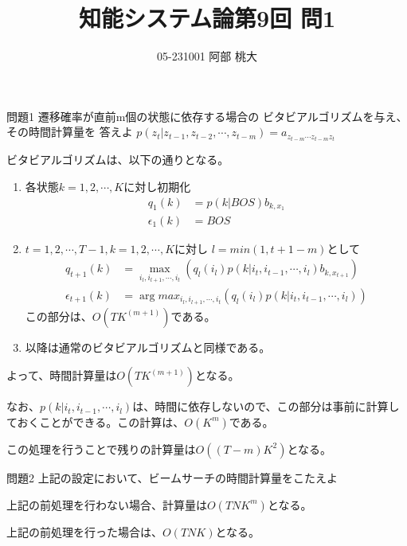 \documentclass[a4paper,11pt]{ltjsarticle}
\begin{document}
\title{知能システム論第9回 問1}
\author{ 05-231001 阿部 桃大}
\maketitle

\begin{itembox}[l]{問題1}
  遷移確率が直前m個の状態に依存する場合の
  ビタビアルゴリズムを与え、その時間計算量を
  答えよ\newline
  $p(z_t|z_{t-1}, z_{t-2}, \cdots, z_{t-m}) = a_{z_{t-m}\cdots z_{t-m}z_t}$
\end{itembox}
ビタビアルゴリズムは、以下の通りとなる。
\begin{enumerate}
  \item 各状態$k=1,2,\cdots,K$に対し初期化
        \begin{align*}
          q_1(k)         & = p(k|BOS)b_{k,x_1} \\
          \epsilon _1(k) & = BOS
        \end{align*}
  \item $t=1,2,\cdots,T-1, k=1,2,\cdots,K$に対し
        $l=min(1,t+1-m)$として
        \begin{align*}
          q_{t+1}(k)         & = \max_{i_l,i_{l+1},\cdots,i_t} (q_l(i_l)p(k|i_t,i_{t-1},\cdots,i_l)b_{k,x_{t+1}}) \\
          \epsilon _{t+1}(k) & = \arg max_{i_l,i_{l+1},\cdots,i_t} (q_l(i_l)p(k|i_t,i_{t-1},\cdots,i_l))
        \end{align*}
        この部分は、$O(TK^{(m+1)})$である。
  \item 以降は通常のビタビアルゴリズムと同様である。
\end{enumerate}
よって、時間計算量は$O(TK^{(m+1)})$となる。

なお、$p(k|i_t,i_{t-1},\cdots,i_l)$は、時間に依存しないので、この部分は事前に計算しておくことができる。この計算は、$O(K^m)$である。

この処理を行うことで残りの計算量は$O((T-m)K^2)$となる。

\begin{itembox}
  [l]{問題2}
  上記の設定において、ビームサーチの時間計算量をこたえよ
\end{itembox}
上記の前処理を行わない場合、計算量は$O(TNK^m)$となる。

上記の前処理を行った場合は、$O(TNK)$となる。
\end{document}
